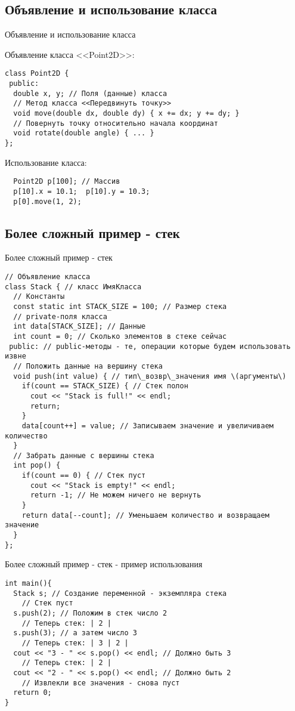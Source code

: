 \subsection{Объявление и использование класса}
\begin{frame}[t,fragile]{Объявление и использование класса}

Объявление класса <<Point2D>>:
\begin{lstlisting}
class Point2D {
 public:
  double x, y; // Поля (данные) класса
  // Метод класса <<Передвинуть точку>>
  void move(double dx, double dy) { x += dx; y += dy; }
  // Повернуть точку относительно начала координат
  void rotate(double angle) { ... }
};
\end{lstlisting}

Использование класса:
\begin{lstlisting}
  Point2D p[100]; // Массив
  p[10].x = 10.1;  p[10].y = 10.3;
  p[0].move(1, 2);
\end{lstlisting}

\end{frame}

\subsection{Более сложный пример - стек}

\begin{frame}[t,fragile]{Более сложный пример - стек}
\begin{lstlisting}
// Объявление класса
class Stack { // класс ИмяКласса
  // Константы
  const static int STACK_SIZE = 100; // Размер стека
  // private-поля класса
  int data[STACK_SIZE]; // Данные
  int count = 0; // Сколько элементов в стеке сейчас
 public: // public-методы - те, операции которые будем использовать извне
  // Положить данные на вершину стека
  void push(int value) { // тип\_возвр\_значения имя \(аргументы\)
    if(count == STACK_SIZE) { // Стек полон
      cout << "Stack is full!" << endl;
      return;
    }
    data[count++] = value; // Записываем значение и увеличиваем количество
  }
  // Забрать данные с вершины стека
  int pop() {
    if(count == 0) { // Стек пуст
      cout << "Stack is empty!" << endl;
      return -1; // Не можем ничего не вернуть
    }
    return data[--count]; // Уменьшаем количество и возвращаем значение
  }
};
\end{lstlisting}
\end{frame}

\begin{frame}[t,fragile]{Более сложный пример - стек - пример использования}
\begin{lstlisting}
int main(){
  Stack s; // Создание переменной - экземпляра стека
    // Стек пуст
  s.push(2); // Положим в стек число 2
    // Теперь стек: | 2 |
  s.push(3); // а затем число 3
    // Теперь стек: | 3 | 2 |
  cout << "3 - " << s.pop() << endl; // Должно быть 3
    // Теперь стек: | 2 |  
  cout << "2 - " << s.pop() << endl; // Должно быть 2
    // Извлекли все значения - снова пуст 
  return 0;
}
\end{lstlisting}
\end{frame}

